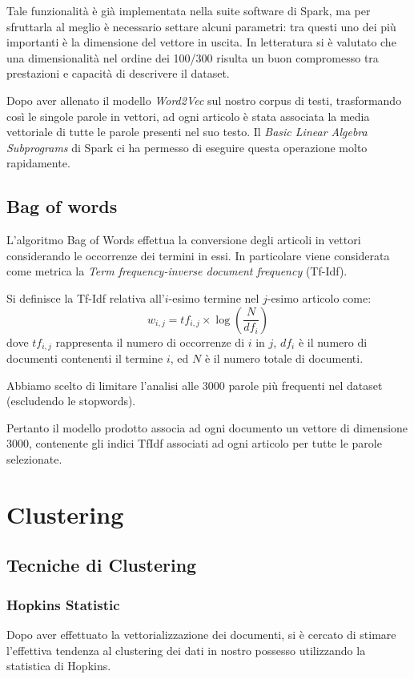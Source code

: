 \documentclass[
	11pt, %
	a4paper, %
	oneside, %
	headinclude,footinclude, %
	BCOR5mm, %
]{scrartcl}
\begin{document}
		Tale funzionalità è già implementata nella suite software di Spark, ma per sfruttarla al meglio è necessario settare alcuni parametri: tra questi uno dei più importanti è la dimensione del vettore in uscita.
		In letteratura si è valutato che una dimensionalità nel ordine dei 100/300\cite{w2vdim} risulta un buon compromesso tra prestazioni e capacità di descrivere il dataset.

		Dopo aver allenato il modello \emph{Word2Vec} sul nostro corpus di testi, trasformando così le singole parole in vettori, ad ogni articolo è stata associata la media vettoriale di tutte le parole presenti nel suo testo. Il \emph{Basic Linear Algebra Subprograms} di Spark ci ha permesso di eseguire questa operazione molto rapidamente.

	\subsection{Bag of words} \label{sec:bag_of_words}

	L'algoritmo Bag of Words\cite{bagofwords} effettua la conversione degli articoli in vettori considerando le occorrenze dei termini in essi.
	In particolare viene considerata come metrica la \textit{Term frequency-inverse document frequency} (Tf-Idf).

	Si definisce la Tf-Idf relativa all'$i$-esimo termine nel $j$-esimo articolo come:
	$$ w_{i,j}=tf_{i,j}\times\log \left(\frac{N}{df_{i}} \right) $$
	dove $tf_{i,j}$ rappresenta il numero di occorrenze di $i$ in $j$, $df_{i}$ è il numero di documenti contenenti il termine $i$, ed $N$ è il numero totale di documenti.

	Abbiamo scelto di limitare l'analisi alle 3000 parole pi\`{u} frequenti nel dataset (escludendo le stopwords).

	Pertanto il modello prodotto associa ad ogni documento un vettore di dimensione 3000, contenente gli indici TfIdf associati ad ogni articolo per tutte le parole selezionate.

\section{Clustering}

	\subsection{Tecniche di Clustering}

		\subsubsection{Hopkins Statistic}
			Dopo aver effettuato la vettorializzazione dei documenti, si è cercato di stimare l'effettiva tendenza al clustering dei dati in nostro possesso utilizzando la statistica di Hopkins\cite{hopkins}.
			
\end{document}
